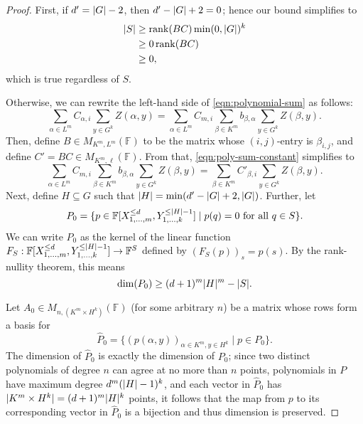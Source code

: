 \documentclass[english]{reedthesis}
\theoremstyle{plain}
\theoremstyle{definition}
\theoremstyle{remark}
\DeclareMathOperator{\rk}{rank}
\DeclarePairedDelimiter{\abs}{\lvert}{\rvert}
\begin{document}
\begin{proof}
  First, if $d' = \abs{G} - 2$, then $d' - \abs{G} + 2 = 0$; hence our bound
  simplifies to
  \begin{align*}
    \abs{S} &\ge \rk(BC)\min(0, \abs{G})^{k} \\
            &\ge 0\rk(BC) \\
            &\ge 0,
  \end{align*}
  which is true regardless of $S$.

  Otherwise, we can rewrite the left-hand side of \cref{eqn:polynomial-sum} as
  follows:
  \begin{equation}\label{eqn:poly-sum-constant}
    \sum_{\alpha \in L^{m}}C_{\alpha,i}\sum_{y \in G^{k}}Z(\alpha,y) = \sum_{\alpha \in L^{m}}C_{m,i}\sum_{\beta \in K^{m}}b_{\beta,\alpha}\sum_{y \in G^{k}}Z(\beta,y).
  \end{equation}
  Then, define $B \in M_{K^{m},L^{m}}(\mathbb{F})$ to be the matrix whose
  $(i,j)$-entry is $\beta_{i,j}$, and define $C' = BC \in M_{K^{m},\ell}(\mathbb{F})$.
  From that, \cref{eqn:poly-sum-constant} simplifies to
  \begin{equation}\label{eqn:poly-sum-prime}
    \sum_{\alpha \in L^{m}}C_{m,i}\sum_{\beta \in K^{m}}b_{\beta,\alpha}\sum_{y \in G^{k}}Z(\beta,y) = \sum_{\beta \in K^{m}}C'_{\beta,i}\sum_{y \in G^{k}}Z(\beta,y).
  \end{equation}
  Next, define $H \subseteq G$ such that $\abs{H} = \min(d' - \abs{G} + 2, \abs{G})$.
  Further, let
  \[
    P_{0} = \{p \in \mathbb{F}[X_{1, \ldots, m}^{\le d}, Y_{1, \ldots, k}^{\le \abs{H} - 1}]
      \mid p(q) = 0 \text{ for all } q \in S\}.
  \]
  We can write $P_{0}$ as the kernel of the linear function
  $F_{S}: \mathbb{F}[X_{1, \ldots, m}^{\le d}, Y_{1, \ldots, k}^{\le \abs{H} - 1}] \rightarrow \mathbb{F}^{S}$
  defined by $(F_{S}(p))_{s} = p(s)$. By the rank-nullity theorem, this means
  \[
    \dim(P_{0}) \ge (d+1)^{m}\abs{H}^{m} - \abs{S}.
  \]

  Let $A_{0} \in M_{n,(K^{m} \times H^{k})}(\mathbb{F})$ (for some arbitrary $n$) be a
  matrix whose rows form a basis for
  \[
    \hat{P}_{0} = \{(p(\alpha,y))_{\alpha \in K^{m},y \in H^{k}} \mid p \in P_{0}\}.
  \]
  The dimension of $\hat{P}_{0}$ is exactly the dimension of $P_{0}$; since two
  distinct polynomials of degree $n$ can agree at no more than $n$ points,
  polynomials in $P$ have maximum degree $d^{m}(\abs{H}-1)^{k}$, and each vector
  in $\hat{P}_{0}$ has $\abs{K^{m} \times H^{k}} = (d+1)^{m}\abs{H}^{k}$ points, it
  follows that the map from $p$ to its corresponding vector in $\hat{P}_{0}$ is
  a bijection and thus dimension is preserved.


\end{proof}
\end{document}
